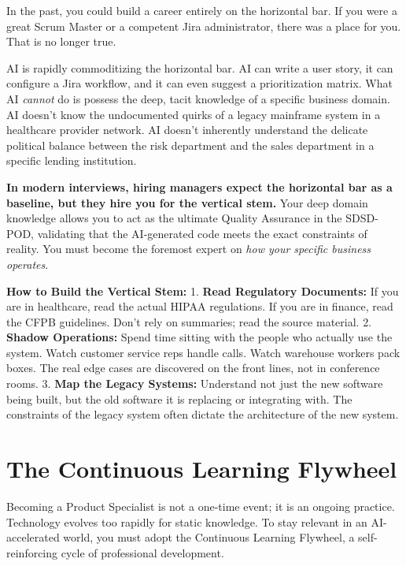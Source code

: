 \documentclass[
  11pt,
  openany,
  oneside]{book}
\begin{document}
In the past, you could build a career entirely on the horizontal bar. If
you were a great Scrum Master or a competent Jira administrator, there
was a place for you. That is no longer true.

AI is rapidly commoditizing the horizontal bar. AI can write a user
story, it can configure a Jira workflow, and it can even suggest a
prioritization matrix. What AI \emph{cannot} do is possess the deep,
tacit knowledge of a specific business domain. AI doesn't know the
undocumented quirks of a legacy mainframe system in a healthcare
provider network. AI doesn't inherently understand the delicate
political balance between the risk department and the sales department
in a specific lending institution.

\textbf{In modern interviews, hiring managers expect the horizontal bar
as a baseline, but they hire you for the vertical stem.} Your deep
domain knowledge allows you to act as the ultimate Quality Assurance in
the SDSD-POD, validating that the AI-generated code meets the exact
constraints of reality. You must become the foremost expert on \emph{how
your specific business operates}.

\textbf{How to Build the Vertical Stem:} 1. \textbf{Read Regulatory
Documents:} If you are in healthcare, read the actual HIPAA regulations.
If you are in finance, read the CFPB guidelines. Don't rely on
summaries; read the source material. 2. \textbf{Shadow Operations:}
Spend time sitting with the people who actually use the system. Watch
customer service reps handle calls. Watch warehouse workers pack boxes.
The real edge cases are discovered on the front lines, not in conference
rooms. 3. \textbf{Map the Legacy Systems:} Understand not just the new
software being built, but the old software it is replacing or
integrating with. The constraints of the legacy system often dictate the
architecture of the new system.

\bigskip

\section{The Continuous Learning
Flywheel}\label{the-continuous-learning-flywheel}

Becoming a Product Specialist is not a one-time event; it is an ongoing
practice. Technology evolves too rapidly for static knowledge. To stay
relevant in an AI-accelerated world, you must adopt the Continuous
Learning Flywheel, a self-reinforcing cycle of professional development.
\end{document}
